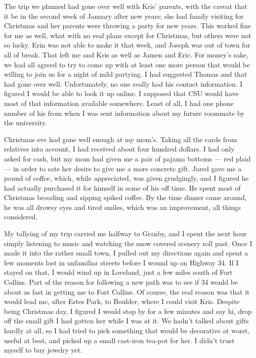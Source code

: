 The trip we planned had gone over well with Kris' parents, with the caveat that it be in the second week of January after new years; she had family visiting for Christmas and her parents were throwing a party for new years.  This worked fine for me as well, what with no real plans except for Christmas, but others were not so lucky.  Erin was not able to make it that week, and Joseph was out of town for all of break.  That left me and Kris as well as Jamen and Eric.  For money's sake, we had all agreed to try to come up with at least one more person that would be willing to join us for a night of mild partying.  I had suggested Thomas and that had gone over well.  Unfortunately, no one really had his contact information.  I figured I would be able to look it up online.  I supposed that CSU would have most of that information available somewhere.  Least of all, I had one phone number of his from when I was sent information about my future roommate by the university.

Christmas eve had gone well enough at my mom's.  Taking all the cards from relatives into account, I had received about four hundred dollars.  I had only asked for cash, but my mom had given me a pair of pajama bottoms --- red plaid --- in order to sate her desire to give me a more concrete gift.  Jared gave me a pound of coffee, which, while appreciated, was given grudgingly, and I figured he had actually purchased it for himself in some of his off time.  He spent most of Christmas brooding and sipping spiked coffee.  By the time dinner came around, he was all drowsy eyes and tired smiles, which was an improvement, all things considered.

My tallying of my trip carried me halfway to Granby, and I spent the next hour simply listening to music and watching the snow covered scenery roll past.  Once I made it into the rather small town, I pulled out my directions again and spent a few moments lost in unfamiliar streets before I wound up on Highway 34.  If I stayed on that, I would wind up in Loveland, just a few miles south of Fort Collins.  Part of the reason for following a new path was to see if 34 would be about as fast in getting me to Fort Collins.  Of course, the real reason was that it would lead me, after Estes Park, to Boulder, where I could visit Kris.  Despite being Christmas day, I figured I would stop by for a few minutes and say hi, drop off the small gift I had gotten her while I was at it.  We hadn't talked about gifts hardly at all, so I had tried to pick something that would be decorative at worst, useful at best, and picked up a small cast-iron tea-pot for her.  I didn't trust myself to buy jewelry yet.

